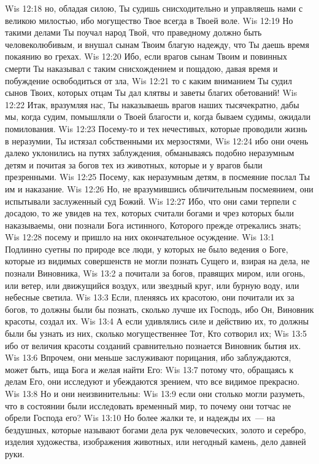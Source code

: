 \vs Wis 12:18 но, обладая силою, Ты судишь снисходительно и управляешь нами с великою милостью, ибо могущество Твое всегда в Твоей воле.
\vs Wis 12:19 Но такими делами Ты поучал народ Твой, что праведному должно быть человеколюбивым, и внушал сынам Твоим благую надежду, что Ты даешь время покаянию во грехах.
\vs Wis 12:20 Ибо, если врагов сынам Твоим и повинных смерти Ты наказывал с таким снисхождением и пощадою, давая  время и побуждение освободиться от зла,
\vs Wis 12:21 то с каким вниманием Ты судил сынов Твоих, которых отцам Ты дал клятвы и заветы благих обетований!
\vs Wis 12:22 Итак, вразумляя нас, Ты наказываешь врагов наших тысячекратно, дабы мы, когда судим, помышляли о Твоей благости и, когда бываем судимы, ожидали помилования.
\vs Wis 12:23 Посему-то и тех нечестивых, которые проводили жизнь в неразумии, Ты истязал собственными их мерзостями,
\vs Wis 12:24 ибо они очень далеко уклонились на путях заблуждения, обманываясь подобно неразумным детям и почитая за богов тех из животных, которые и у врагов были презренными.
\vs Wis 12:25 Посему, как неразумным детям, в посмеяние послал Ты им и наказание.
\vs Wis 12:26 Но, не вразумившись обличительным посмеянием, они испытывали заслуженный суд Божий.
\vs Wis 12:27 Ибо, что они сами терпели с досадою, то же увидев на тех, которых считали богами и чрез которых были наказываемы, они познали Бога истинного, Которого прежде отрекались знать;
\vs Wis 12:28 посему и пришло на них окончательное осуждение.
\vs Wis 13:1 Подлинно суетны по природе все люди, у которых не было ведения о Боге, которые из видимых совершенств не могли познать Сущего и, взирая на дела, не познали Виновника,
\vs Wis 13:2 а почитали за богов, правящих миром, или огонь, или ветер, или движущийся воздух, или звездный круг, или бурную воду, или небесные светила.
\vs Wis 13:3 Если, пленяясь их красотою, они почитали их за богов, то должны были бы познать, сколько лучше их Господь, ибо Он, Виновник красоты, создал их.
\vs Wis 13:4 А если удивлялись силе и действию их, то должны были бы узнать из них, сколько могущественнее Тот, Кто сотворил их;
\vs Wis 13:5 ибо от величия красоты созданий сравнительно познается Виновник бытия их.
\vs Wis 13:6 Впрочем, они меньше заслуживают порицания, ибо заблуждаются, может быть, ища Бога и желая найти Его:
\vs Wis 13:7 потому что, обращаясь к делам Его, они исследуют и убеждаются зрением, что все видимое прекрасно.
\vs Wis 13:8 Но и они неизвинительны:
\vs Wis 13:9 если они столько могли разуметь, что в состоянии были исследовать временный мир, то почему они тотчас не обрели Господа его?
\vs Wis 13:10 Но более жалки те, и надежды их~--- на бездушных, которые называют богами дела рук человеческих, золото и серебро, изделия художества, изображения животных, или негодный камень, дело давней руки.
